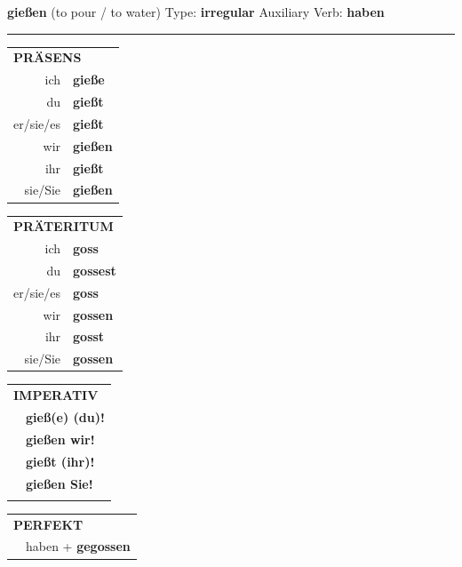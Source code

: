 \documentclass[10pt,a4paper]{revtex4-2}
\begin{document}
\begin{verbbox}
    {\Large \bf gießen} (to pour / to water) \hfill Type: \textbf{irregular} \hfill Auxiliary Verb: \textbf{haben} 
    
     \vspace{5pt}

    \hrule
    
    \vspace{5pt}

  \begin{tabular}{rl}
     \multicolumn{2}{l}{\textbf{PRÄSENS} }\\
    ich & \textbf{gieße}\\
    du & \textbf{gießt}\\
    er/sie/es & \textbf{gießt}\\
    wir & \textbf{gießen}\\
    ihr & \textbf{gießt}\\
    sie/Sie & \textbf{gießen}\\
  \end{tabular}
  \hfill
     \begin{tabular}{rl}
    \multicolumn{2}{l}{\textbf{PRÄTERITUM} }\\
    ich & \textbf{goss}\\
    du & \textbf{gossest}\\
    er/sie/es & \textbf{goss}\\
    wir & \textbf{gossen}\\
    ihr & \textbf{gosst}\\
    sie/Sie & \textbf{gossen}\\
  \end{tabular}
  \hfill
  \begin{tabular}{rl}
     \multicolumn{2}{l}{\textbf{IMPERATIV} }\\
   & \textbf{gieß(e) (du)!}\\
   & \textbf{gießen wir!}\\
   & \textbf{gießt (ihr)!}\\
   & \textbf{gießen Sie!}\\
   & \vspace{10pt}
  \end{tabular}

    \vspace{10pt}

 \begin{tabular}{rl}
     \multicolumn{2}{l}{\textbf{PERFEKT}}\\
   & haben + \textbf{gegossen}\\
  \end{tabular}
\hfill
   \begin{tabular}{rl}
   

\end{tabular}
\end{verbbox}
\end{document}
